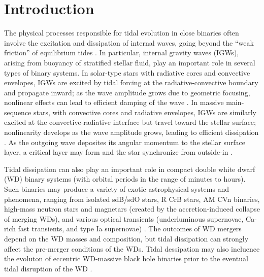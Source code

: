 \documentclass[
        fleqn,
        usenatbib,
        referee,
    ]{mnras}
\begin{document}
\section{Introduction}\label{s:intro}

The physical processes responsible for tidal evolution in close binaries often
involve the excitation and dissipation of internal waves, going beyond the
``weak friction'' of equilibrium tides \citep[see][for a
review]{ogilvie2014tidal}. In particular, internal gravity waves (IGWs), arising
from buoyancy of stratified stellar fluid, play an important role in several
types of binary systems. In solar-type stars with radiative cores and convective
envelopes, IGWs are excited by tidal forcing at the radiative-convective
boundary and propagate inward; as the wave amplitude grows due to geometric
focusing, nonlinear effects can lead to efficient damping of the wave
\citep{goodman1998dynamical,barker_ogilvie,essick2015orbital}. In massive
main-sequence stars, with convective cores and radiative envelopes, IGWs are
similarly excited at the convective-radiative interface but travel toward the
stellar surface; nonlinearity develops as the wave amplitude grows, leading to
efficient dissipation \citep{zahn75,zahn77}. As the outgoing wave deposites its
angular momentum to the stellar surface layer, a critical layer may form and the
star synchronize from outside-in \citep{gn89}.

Tidal dissipation can also play an important role in compact double white dwarf
(WD) binary systems (with orbital periods in the range of minutes to hours).
Such binaries may produce a variety of exotic astrophysical systems and
phenomena, ranging from isolated sdB/sdO stars,
R CrB stars,
AM CVn binaries,
high-mass neutron stars and magnetars (created by the accretion-induced
collapse of merging WDs),
and various optical transients (underluminous supernovae, Ca-rich fast
transients, and type Ia supernovae)
\citep[e.g.][]{livio2018progenitors,gaiaDD2,toloza2019understanding,
underlum,carich,Ia1,Ia2}. The outcomes of WD mergers depend on the WD masses
and composition, but tidal dissipation can strongly affect the pre-merger
conditions of the WDs. Tidal dessipation may also incluence the evoluton of
eccentric WD-massive black hole binaries prior to the eventual tidal disruption
of the WD \citep{vick2017tidal}.
\end{document}
